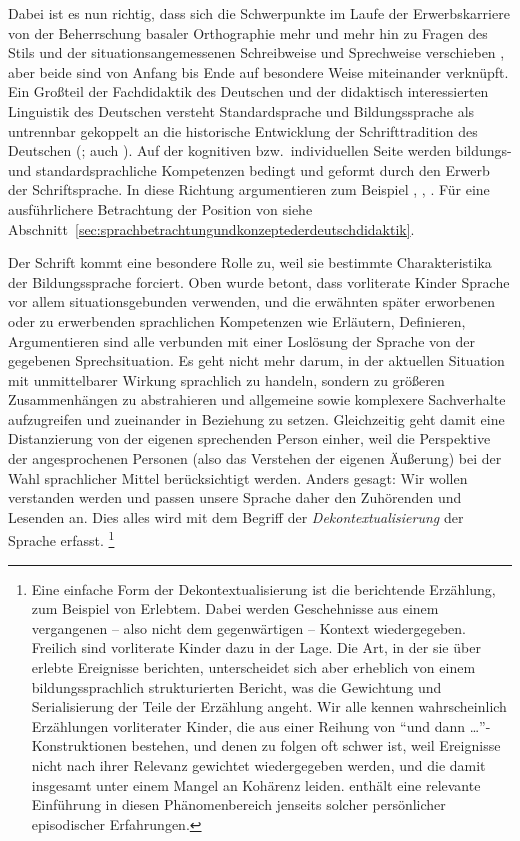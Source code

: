 Dabei ist es nun richtig, dass sich die Schwerpunkte im Laufe der Erwerbskarriere von der Beherrschung basaler Orthographie mehr und mehr hin zu Fragen des Stils und der situationsangemessenen Schreibweise und Sprechweise verschieben \citep[77]{Portmanntselikas2011}, aber beide sind von Anfang bis Ende auf besondere Weise miteinander verknüpft.
Ein Großteil der Fachdidaktik des Deutschen und der didaktisch interessierten Linguistik des Deutschen versteht Standardsprache und Bildungssprache als untrennbar gekoppelt an die historische Entwicklung der Schrifttradition des Deutschen (\citealt[130--150]{Bredel2013}; auch \citealt{Nerius2007}).
Auf der kognitiven bzw.\ individuellen Seite werden bildungs- und standardsprachliche Kompetenzen bedingt und geformt durch den Erwerb der Schriftsprache.
In diese Richtung argumentieren zum Beispiel \citet[4,12,14,15]{Eisenberg2004}, \citet[71,78]{Portmanntselikas2011}, \citet[6]{Feilke2012}.
Für eine ausführlichere Betrachtung der Position von \citet{Bredel2013} siehe Abschnitt~\ref{sec:sprachbetrachtungundkonzeptederdeutschdidaktik}.

Der Schrift kommt eine besondere Rolle zu, weil sie bestimmte Charakteristika der Bildungssprache forciert.
Oben wurde betont, dass vorliterate Kinder Sprache vor allem situationsgebunden verwenden, und die erwähnten später erworbenen oder zu erwerbenden sprachlichen Kompetenzen wie Erläutern, Definieren, Argumentieren sind alle verbunden mit einer Loslösung der Sprache von der gegebenen Sprechsituation.
Es geht nicht mehr darum, in der aktuellen Situation mit unmittelbarer Wirkung sprachlich zu handeln, sondern zu größeren Zusammenhängen zu abstrahieren und allgemeine sowie komplexere Sachverhalte aufzugreifen und zueinander in Beziehung zu setzen.
Gleichzeitig geht damit eine Distanzierung von der eigenen sprechenden Person einher, weil die Perspektive der angesprochenen Personen (also das Verstehen der eigenen Äußerung) bei der Wahl sprachlicher Mittel berücksichtigt werden.
Anders gesagt:
Wir wollen verstanden werden und passen unsere Sprache daher den Zuhörenden und Lesenden an.
Dies alles wird mit dem Begriff der \textit{Dekontextualisierung} der Sprache erfasst.%
\footnote{Eine einfache Form der Dekontextualisierung ist die berichtende Erzählung, zum Beispiel von Erlebtem.
Dabei werden Geschehnisse aus einem vergangenen -- also nicht dem gegenwärtigen -- Kontext wiedergegeben.
Freilich sind vorliterate Kinder dazu in der Lage.
Die Art, in der sie über erlebte Ereignisse berichten, unterscheidet sich aber erheblich von einem bildungssprachlich strukturierten Bericht, was die Gewichtung und Serialisierung der Teile der Erzählung angeht.
Wir alle kennen wahrscheinlich Erzählungen vorliterater Kinder, die aus einer Reihung von "`und dann \ldots"'-Konstruktionen bestehen, und denen zu folgen oft schwer ist, weil Ereignisse nicht nach ihrer Relevanz gewichtet wiedergegeben werden, und die damit insgesamt unter einem Mangel an Kohärenz leiden.
\citet{Bredel2013} enthält eine relevante Einführung in diesen Phänomenbereich jenseits solcher persönlicher episodischer Erfahrungen.}

